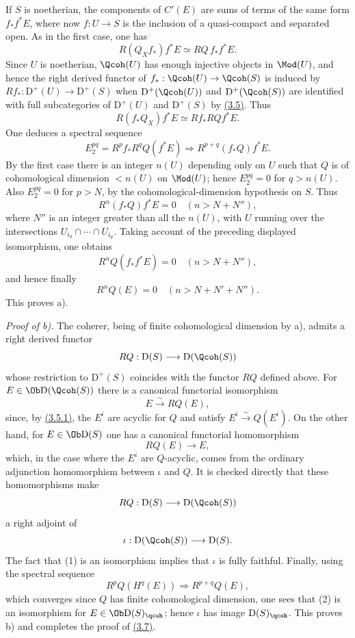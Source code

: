 If $S$ is noetherian, the components of $C'(E)$ are sums of terms of the same form $f_*f^*E$, where now $f:U\to S$ is the inclusion of a quasi-compact and separated open. As in the first case, one has
\[
 R(Q_Xf_*)f^*E\simeq RQ\,f_*f^*E.
\]
Since $U$ is noetherian, $\Qcoh(U)$ has enough injective objects in $\Mod(U)$, and hence the right derived functor of $f_*:\Qcoh(U)\to\Qcoh(S)$ is induced by $Rf_*:\mathrm D^+(U)\to\mathrm D^+(S)$ when $\mathrm D^+(\Qcoh(U))$ and $\mathrm D^+(\Qcoh(S))$ are identified with full subcategories of $\mathrm D^+(U)$ and $\mathrm D^+(S)$ by \hyperlink{sga6.e02.prop.3-5}{(3.5)}. Thus
\[
 R(f_*Q_X)f^*E\simeq Rf_*RQf^*E.
\]
One deduces a spectral sequence
\[
 E_2^{pq}=R^pf_*R^qQ(f^*E)\Longrightarrow R^{p+q}(f_*Q)f^*E.
\]
By the first case there is an integer $n(U)$ depending only on $U$ such that $Q$ is of cohomological dimension $<n(U)$ on $\Mod(U)$; hence $E_2^{pq}=0$ for $q>n(U)$. Also $E_2^{pq}=0$ for $p>N$, by the cohomological-dimension hypothesis on $S$. Thus
\[
 R^n(f_*Q)f^*E=0\quad(n>N+N''),
\]
where $N''$ is an integer greater than all the $n(U)$, with $U$ running over the intersections $U_{i_0}\cap\cdots\cap U_{i_p}$. Taking account of the preceding displayed isomorphism, one obtains
\[
 R^nQ(f_*f^*E)=0\quad(n>N+N''),
\]
and hence finally
\[
 R^nQ(E)=0\quad(n>N+N'+N'').
\]
This proves a).

\emph{Proof of b).} The coherer, being of finite cohomological dimension by a), admits a right derived functor
\[
 RQ:\mathrm D(S)\longrightarrow\mathrm D(\Qcoh(S))
\]
whose restriction to $\mathrm D^+(S)$ coincides with the functor $RQ$ defined above. For $E\in\Ob\mathrm D(\Qcoh(S))$ there is a canonical functorial isomorphism
\begin{equation}\tag{1}
 E\xrightarrow{\sim}RQ(E),
\end{equation}
since, by \hyperlink{sga6.e02.prop.3-5}{(3.5.1)}, the $E^i$ are acyclic for $Q$ and satisfy $E^i\xrightarrow{\sim}Q(E^i)$. On the other hand, for $E\in\Ob\mathrm D(S)$ one has a canonical functorial homomorphism
\begin{equation}\tag{2}
 RQ(E)\longrightarrow E,
\end{equation}
which, in the case where the $E^i$ are $Q$-acyclic, comes from the ordinary adjunction homomorphism between $\iota$ and $Q$. It is checked directly that these homomorphisms make
\[
 RQ:\mathrm D(S)\longrightarrow\mathrm D(\Qcoh(S))
\]
a right adjoint of
\[
 \iota:\mathrm D(\Qcoh(S))\longrightarrow\mathrm D(S).
\]
The fact that (1) is an isomorphism implies that $\iota$ is fully faithful. Finally, using the spectral sequence
\[
 R^pQ(H^q(E))\Longrightarrow R^{p+q}Q(E),
\]
which converges since $Q$ has finite cohomological dimension, one sees that (2) is an isomorphism for $E\in\Ob\mathrm D(S)_{\qcoh}$; hence $\iota$ has image $\mathrm D(S)_{\qcoh}$. This proves b) and completes the proof of \hyperlink{sga6.e02.prop.3-7}{(3.7)}.

